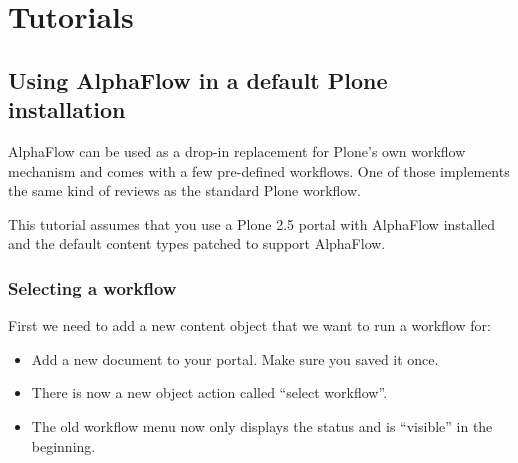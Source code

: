 \chapter{Tutorials}

\section{Using AlphaFlow in a default Plone installation}

AlphaFlow can be used as a drop-in replacement for Plone's own workflow
mechanism and comes with a few pre-defined workflows. One of those implements
the same kind of reviews as the standard Plone workflow.

This tutorial assumes that you use a Plone 2.5 portal with AlphaFlow installed
and the default content types patched to support AlphaFlow.

\subsection{Selecting a workflow}

First we need to add a new content object that we want to run a workflow for:
\begin{itemize}
\item Add a new document to your portal. Make sure you saved it once.
\item There is now a new object action called ``select workflow''.
\item The old workflow menu now only displays the status and is ``visible'' in the beginning.
\end{itemize}

